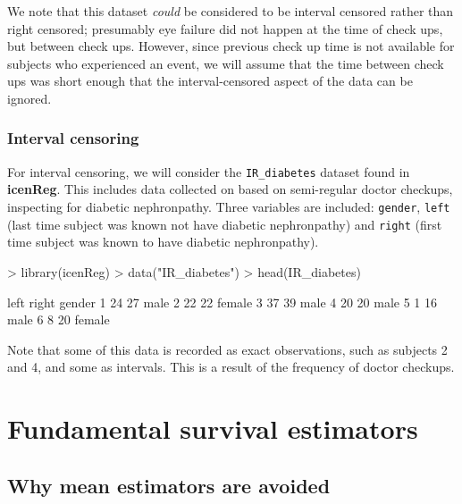 \documentclass[a4paper]{article}
\begin{document}
   We note that this dataset \emph{could} be considered to be interval censored rather than right censored; presumably eye failure did not happen at the time of check ups, but between check ups. However, since previous check up time is not available for subjects who experienced an event, we will assume that the time between check ups was short enough that the interval-censored aspect of the data can be ignored. 

    \subsubsection{Interval censoring}

    For interval censoring, we will consider the \texttt{IR\_diabetes} dataset found in {\bf icenReg}. This includes data collected on based on semi-regular doctor checkups, inspecting for diabetic nephronpathy. Three variables are included: \texttt{gender}, \texttt{left} (last time subject was known not have diabetic nephronpathy) and \texttt{right} (first time subject was known to have diabetic nephronpathy). 
    
\begin{Schunk}
\begin{Sinput}
> library(icenReg)
> data("IR_diabetes")
> head(IR_diabetes)
\end{Sinput}
\begin{Soutput}
  left right gender
1   24    27   male
2   22    22 female
3   37    39   male
4   20    20   male
5    1    16   male
6    8    20 female
\end{Soutput}
\end{Schunk}

Note that some of this data is recorded as exact observations, such as subjects 2 and 4, and some as intervals. This is a result of the frequency of doctor checkups. 


\section{Fundamental survival estimators}
  
  \subsection{Why mean estimators are avoided}
  
\end{document}
